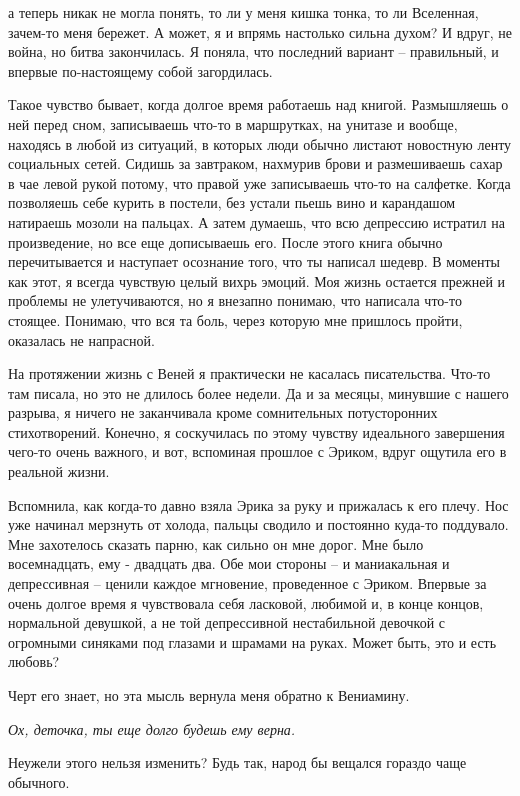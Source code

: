 \documentclass[
]{book}
\begin{document}
а теперь никак не могла понять, то ли у меня кишка тонка, то ли Вселенная, зачем-то меня бережет. А может, я и впрямь настолько сильна духом? И вдруг, не война, но битва закончилась. Я поняла, что последний вариант -- правильный, и впервые по-настоящему собой загордилась.

Такое чувство бывает, когда долгое время работаешь над книгой. Размышляешь о ней перед сном, записываешь что-то в маршрутках, на унитазе и вообще, находясь в любой из ситуаций, в которых люди обычно листают новостную ленту социальных сетей. Сидишь за завтраком, нахмурив брови и размешиваешь сахар в чае левой рукой потому, что правой уже записываешь что-то на салфетке. Когда позволяешь себе курить в постели, без устали пьешь вино и карандашом натираешь мозоли на пальцах. А затем думаешь, что всю депрессию истратил на произведение, но все еще дописываешь его. После этого книга обычно перечитывается и наступает осознание того, что ты написал шедевр. В моменты как этот, я всегда чувствую целый вихрь эмоций. Моя жизнь остается прежней и проблемы не улетучиваются, но я внезапно понимаю, что написала что-то стоящее. Понимаю, что вся та боль, через которую мне пришлось пройти, оказалась не напрасной.

На протяжении жизнь с Веней я практически не касалась писательства. Что-то там писала, но это не длилось более недели. Да и за месяцы, минувшие с нашего разрыва, я ничего не заканчивала кроме сомнительных потусторонних стихотворений. Конечно, я соскучилась по этому чувству идеального завершения чего-то очень важного, и вот, вспоминая прошлое с Эриком, вдруг ощутила его в реальной жизни.

Вспомнила, как когда-то давно взяла Эрика за руку и прижалась к его плечу. Нос уже начинал мерзнуть от холода, пальцы сводило и постоянно куда-то поддувало. Мне захотелось сказать парню, как сильно он мне дорог. Мне было восемнадцать, ему - двадцать два. Обе мои стороны -- и маниакальная и депрессивная -- ценили каждое мгновение, проведенное с Эриком. Впервые за очень долгое время я чувствовала себя ласковой, любимой и, в конце концов, нормальной девушкой, а не той депрессивной нестабильной девочкой с огромными синяками под глазами и шрамами на руках. Может быть, это и есть любовь?

Черт его знает, но эта мысль вернула меня обратно к Вениамину.

\emph{Ох, деточка, ты еще долго будешь ему верна.}

Неужели этого нельзя изменить? Будь так, народ бы вещался гораздо чаще обычного.
\end{document}
